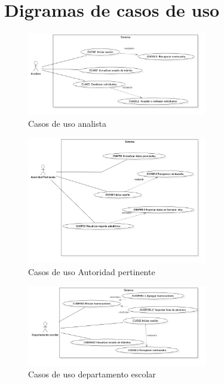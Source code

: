 \section{Digramas de casos de uso}
\begin{figure}[htbp!]
    \centering
        \includegraphics[width=0.7\textwidth]{images/img_casos/Analista.jpg}
    \caption{Casos de uso analista}
\end{figure}

\begin{figure}[htbp!]
    \centering
        \includegraphics[width=0.7\textwidth]{images/img_casos/AutoridadPertinente.jpg}
    \caption{Casos de uso Autoridad pertinente}
\end{figure}

\begin{figure}[htbp!]
    \centering
        \includegraphics[width=0.7\textwidth]{images/img_casos/departamento_escolar.jpg}
    \caption{Casos de uso departamento escolar}
\end{figure}


